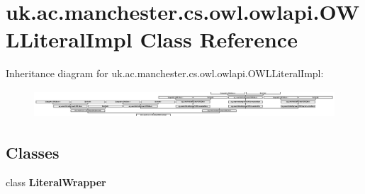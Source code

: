 \hypertarget{classuk_1_1ac_1_1manchester_1_1cs_1_1owl_1_1owlapi_1_1_o_w_l_literal_impl}{\section{uk.\-ac.\-manchester.\-cs.\-owl.\-owlapi.\-O\-W\-L\-Literal\-Impl Class Reference}
\label{classuk_1_1ac_1_1manchester_1_1cs_1_1owl_1_1owlapi_1_1_o_w_l_literal_impl}
}
Inheritance diagram for uk.\-ac.\-manchester.\-cs.\-owl.\-owlapi.\-O\-W\-L\-Literal\-Impl\-:\begin{figure}[H]
\begin{center}
\leavevmode
\includegraphics[height=1.028466cm]{classuk_1_1ac_1_1manchester_1_1cs_1_1owl_1_1owlapi_1_1_o_w_l_literal_impl}
\end{center}
\end{figure}
\subsection*{Classes}
\begin{DoxyCompactItemize}
\item 
class {\bfseries Literal\-Wrapper}
\end{DoxyCompactItemize}
